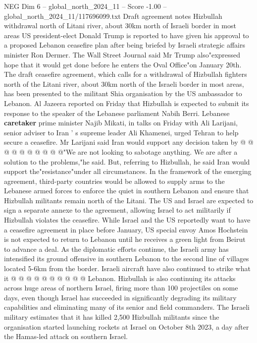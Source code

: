 \begin{textsample}{NEG Dim 6 – global\_north\_2024\_11 – Score -1.00 – global\_north\_2024\_11/117696099.txt}  \label{ex:f6_neg_163}
Draft agreement notes Hizbullah withdrawal north of Litani river, about 30km north of Israeli border in most areas US president-elect Donald Trump is reported to have given his approval to a proposed Lebanon ceasefire plan after being briefed by Israeli strategic affairs minister Ron Dermer.
The Wall Street Journal said Mr Trump also"expressed hope that it would get done before he enters the Oval Office"on January 20th.
The draft ceasefire agreement, which calls for a withdrawal of Hizbullah fighters north of the Litani river, about 30km north of the Israeli border in most areas, has been presented to the militant Shia organisation by the US ambassador to Lebanon.
Al Jazeera reported on Friday that Hizbullah is expected to submit its response to the speaker of the Lebanese parliament Nabih Berri.
Lebanese \textbf{caretaker} prime minister Najib Mikati, in talks on Friday with Ali Larijani, senior adviser to Iran ' s supreme leader Ali Khamenei, urged Tehran to help secure a ceasefire.
Mr Larijani said Iran would support any decision taken by @ @ @ @ @ @ @ @ @ @"We are not looking to sabotage anything.
We are after a solution to the problems,"he said.
But, referring to Hizbullah, he said Iran would support the"resistance"under all circumstances.
In the framework of the emerging agreement, third-party countries would be allowed to supply arms to the Lebanese armed forces to enforce the quiet in southern Lebanon and ensure that Hizbullah militants remain north of the Litani.
The US and Israel are expected to sign a separate annexe to the agreement, allowing Israel to act militarily if Hizbullah violates the ceasefire.
While Israel and the US reportedly want to have a ceasefire agreement in place before January, US special envoy Amos Hochstein is not expected to return to Lebanon until he receives a green light from Beirut to advance a deal.
As the diplomatic efforts continue, the Israeli army has intensified its ground offensive in southern Lebanon to the second line of villages located 5-6km from the border.
Israeli aircraft have also continued to strike what it @ @ @ @ @ @ @ @ @ @ Lebanon.
Hizbullah is also continuing its attacks across huge areas of northern Israel, firing more than 100 projectiles on some days, even though Israel has succeeded in significantly degrading its military capabilities and eliminating many of its senior and field commanders.
The Israeli military estimates that it has killed 2,500 Hizbullah militants since the organisation started launching rockets at Israel on October 8th 2023, a day after the Hamas-led attack on southern Israel.

\end{textsample}
